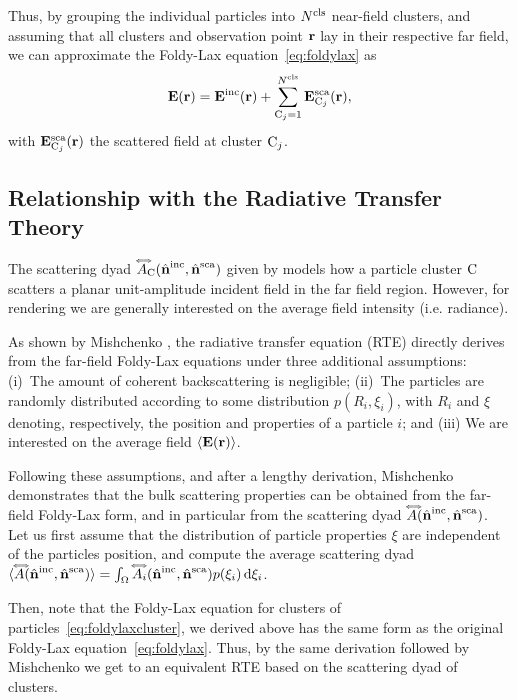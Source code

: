 Thus, by grouping the individual particles into $N^\mathrm{cls}$ near-field clusters, and assuming that all clusters and observation point $\mathbf{r}$ lay in their respective far field, we can approximate the Foldy-Lax equation~\eqref{eq:foldylax} as
\begin{equation}
    \mathbf{E}(\mathbf{r}) = \mathbf{E}^\mathrm{inc}(\mathbf{r}) + \sum_{\mathrm{C}_j=1}^{N^\mathrm{cls}} \mathbf{E}^\mathrm{sca}_{\mathrm{C}_j}(\mathbf{r}),
    \label{eq:foldylaxcluster}
\end{equation}
with $\mathbf{E}^\mathrm{sca}_{\mathrm{C}_j}(\mathbf{r})$ the scattered field at cluster $\mathrm{C}_j$. 


\subsection{Relationship with the Radiative Transfer Theory}
\label{ssec:ours_RTT}

The scattering dyad ${\accentset{\Longleftrightarrow}{A}}_{\mathrm{C}}({\hat{\mathbf{n}}}^\mathrm{inc},{\hat{\mathbf{n}}}^\mathrm{sca})$ given by  models how a particle cluster $\mathrm{C}$ scatters a planar unit-amplitude incident field in the far field region. However, for rendering we are generally interested on the average field intensity (i.e. radiance). 

As shown by Mishchenko \cite{mishchenko2002vector}, the radiative transfer equation (RTE) directly derives from the far-field Foldy-Lax equations under three additional assumptions: (i)~The amount of coherent backscattering is negligible; (ii)~The particles are randomly distributed according to some distribution $p(R_i,\xi_i)$, with $R_i$ and $\xi$ denoting, respectively, the position and properties of a particle $i$; and (iii) We are interested on the average field ${\langle \mathbf{E}(\mathbf{r}) \rangle}$. 

Following these assumptions, and after a lengthy derivation, Mishchenko demonstrates that the bulk scattering properties can be obtained from the far-field Foldy-Lax form, and in particular from the scattering dyad ${\accentset{\Longleftrightarrow}{A}}({\hat{\mathbf{n}}}^\mathrm{inc},{\hat{\mathbf{n}}}^\mathrm{sca})$. Let us first assume that the distribution of particle properties $\xi$ are independent of the particles position, and compute the average scattering dyad ${\langle {\accentset{\Longleftrightarrow}{A}}({\hat{\mathbf{n}}}^\mathrm{inc},{\hat{\mathbf{n}}}^\mathrm{sca}) \rangle} = \int_\Omega {\accentset{\Longleftrightarrow}{A}}_i({\hat{\mathbf{n}}}^\mathrm{inc},{\hat{\mathbf{n}}}^\mathrm{sca}) p(\xi_i) \,\mathrm{d} \xi_i$. 

Then, note that the Foldy-Lax equation for clusters of particles~\eqref{eq:foldylaxcluster}, we derived above has the same form as the original Foldy-Lax equation~\eqref{eq:foldylax}. Thus, by the same derivation followed by Mishchenko we get to an equivalent RTE based on the scattering dyad of clusters. 

